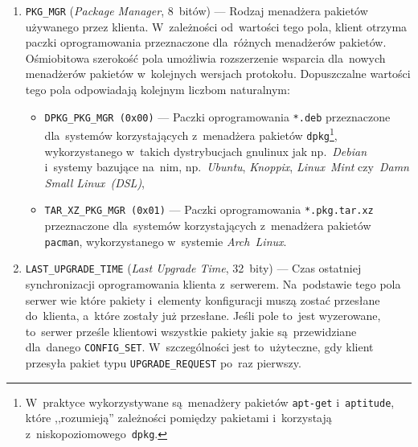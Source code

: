 \documentclass[thesis]{subfiles}
\begin{document}
\begin{enumerate}
	\item \texttt{PKG\_MGR} (\emph{Package Manager}, 8~bitów) --- Rodzaj menadżera pakietów używanego przez klienta. W~zależności od~wartości tego pola, klient otrzyma paczki oprogramowania przeznaczone dla~różnych menadżerów pakietów. Ośmiobitowa szerokość pola umożliwia rozszerzenie wsparcia dla~nowych menadżerów pakietów w~kolejnych wersjach protokołu. Dopuszczalne wartości tego pola odpowiadają kolejnym liczbom naturalnym:
		\begin{itemize}
			\item \texttt{DPKG\_PKG\_MGR (0x00)} --- Paczki oprogramowania \texttt{*.deb} przeznaczone dla~systemów korzystających z~menadżera pakietów \texttt{dpkg}\footnote{W~praktyce wykorzystywane są~menadżery pakietów \texttt{apt-get} i~\texttt{aptitude}, które ,,rozumieją'' zależności pomiędzy pakietami i~korzystają z~niskopoziomowego~\texttt{dpkg}.}, wykorzystanego w~takich dystrybucjach \gls{gnulinux} jak np.~\emph{Debian} i~systemy bazujące na~nim, np.~\emph{Ubuntu}, \emph{Knoppix}, \emph{Linux~Mint} czy~\emph{Damn Small Linux~(DSL)},
			\item \texttt{TAR\_XZ\_PKG\_MGR (0x01)} --- Paczki oprogramowania \texttt{*.pkg.tar.xz} przeznaczone dla~systemów korzystających z~menadżera pakietów \texttt{pacman}, wykorzystanego w~systemie \emph{Arch~Linux}.
		\end{itemize}
	\item \texttt{LAST\_UPGRADE\_TIME} (\emph{Last Upgrade Time}, 32~bity) --- Czas ostatniej synchronizacji oprogramowania klienta z~serwerem. Na~podstawie tego pola serwer wie które pakiety i~elementy konfiguracji muszą zostać przesłane do~klienta, a~które zostały już przesłane. Jeśli pole to~jest wyzerowane, to~serwer prześle klientowi wszystkie pakiety jakie są~przewidziane dla~danego \texttt{CONFIG\_SET}. W~szczególności jest to~użyteczne, gdy klient przesyła pakiet typu \texttt{UPGRADE\_REQUEST} po~raz pierwszy.
\end{enumerate}
\end{document}
